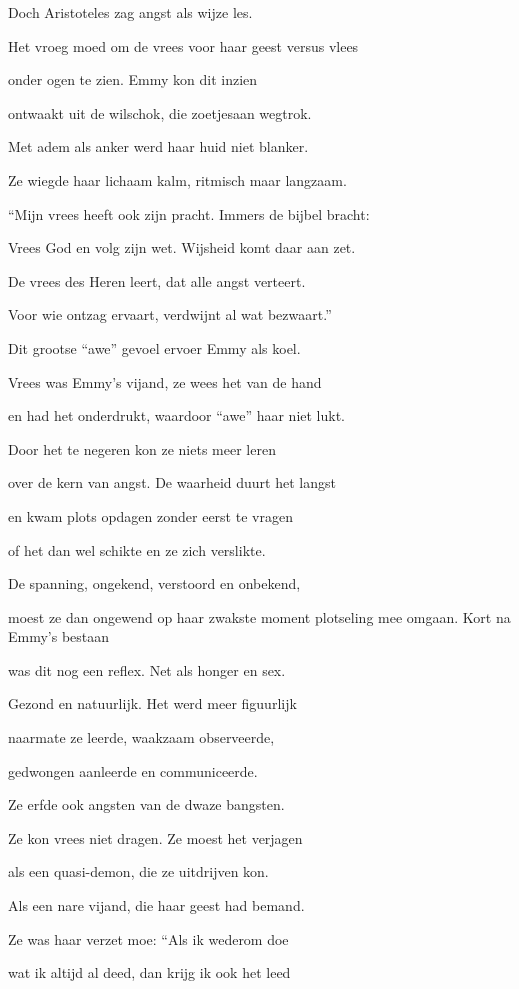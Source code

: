 Doch Aristoteles
zag angst als wijze les.

Het vroeg moed om de vrees
voor haar geest versus vlees

onder ogen te zien.
Emmy kon dit inzien

ontwaakt uit de wilschok,
die zoetjesaan wegtrok.

Met adem als anker
werd haar huid niet blanker.

Ze wiegde haar lichaam
kalm, ritmisch maar langzaam.

“Mijn vrees heeft ook zijn pracht.
Immers de bijbel bracht:

Vrees God en volg zijn wet.
Wijsheid komt daar aan zet.

De vrees des Heren leert,
dat alle angst verteert.

Voor wie ontzag ervaart,
verdwijnt al wat bezwaart.”

Dit grootse “awe” gevoel
ervoer Emmy als koel.

Vrees was Emmy’s vijand,
ze wees het van de hand

en had het onderdrukt,
waardoor “awe” haar niet lukt.

Door het te negeren
kon ze niets meer leren

over de kern van angst.
De waarheid duurt het langst

en kwam plots opdagen
zonder eerst te vragen

of het dan wel schikte
en ze zich verslikte.

De spanning, ongekend,
verstoord en onbekend,

moest ze dan ongewend
op haar zwakste moment
plotseling mee omgaan.
Kort na Emmy’s bestaan

was dit nog een reflex.
Net als honger en sex.

Gezond en natuurlijk.
Het werd meer figuurlijk

naarmate ze leerde,
waakzaam observeerde,

gedwongen aanleerde
en communiceerde.

Ze erfde ook angsten
van de dwaze bangsten.

Ze kon vrees niet dragen.
Ze moest het verjagen

als een quasi-demon,
die ze uitdrijven kon.

Als een nare vijand,
die haar geest had bemand.

Ze was haar verzet moe:
“Als ik wederom doe

wat ik altijd al deed,
dan krijg ik ook het leed

